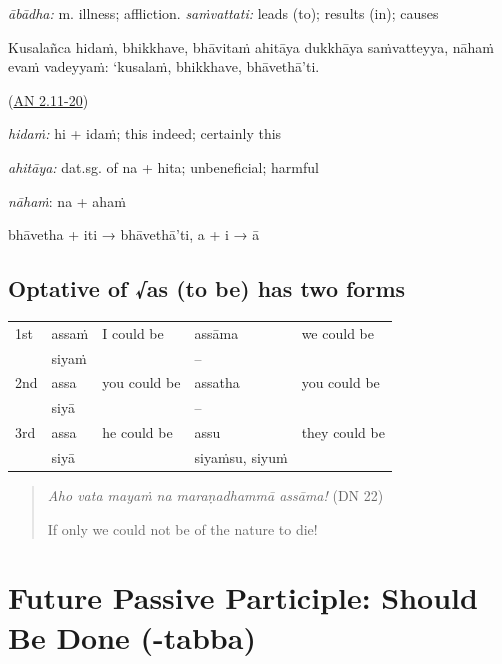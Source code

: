 \documentclass[11pt,oneside]{memoir}
\begin{document}
\normalArrayStretch
\vspace*{-0.5\baselineskip}

\emph{ābādha:} m. illness; affliction. \emph{saṁvattati:} leads (to); results (in); causes

\bigskip

\begin{widecols}
Kusalañca hidaṁ, bhikkhave, bhāvitaṁ ahitāya dukkhāya saṁvatteyya, nāhaṁ evaṁ
vadeyyaṁ: `kusalaṁ, bhikkhave, bhāvethā'ti.

(\href{https://suttacentral.net/an2.11-20/pli/ms}{AN 2.11-20})

\columnbreak

\emph{hidaṁ:} hi + idaṁ; this indeed; certainly this

\emph{ahitāya:} dat.sg. of na + hita; unbeneficial; harmful

\emph{nāhaṁ}: na + ahaṁ

bhāvetha + iti → bhāvethā'ti, a + i → ā
\end{widecols}
\subsection{Optative of √as (to be) has two forms}
\label{sec:orgf65d1e5}

\begin{center}
\begin{tabular}{lllll}
1st & assaṁ & I could be & assāma & we could be\\
 & siyaṁ &  & -- & \\
\hline
2nd & assa & you could be & assatha & you could be\\
 & siyā &  & -- & \\
\hline
3rd & assa & he could be & assu & they could be\\
 & siyā &  & siyaṁsu, siyuṁ & \\
\end{tabular}
\end{center}

\begin{quote}
\emph{Aho vata mayaṁ na maraṇadhammā assāma!} (DN 22)

If only we could not be of the nature to die!
\end{quote}
\section{Future Passive Participle: Should Be Done (-tabba)}
\label{sec:org2957371}
\end{document}
